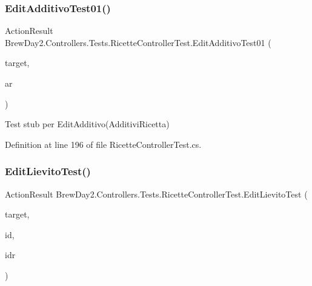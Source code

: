\subsubsection{\texorpdfstring{Edit\+Additivo\+Test01()}{EditAdditivoTest01()}}
{\footnotesize\ttfamily Action\+Result Brew\+Day2.\+Controllers.\+Tests.\+Ricette\+Controller\+Test.\+Edit\+Additivo\+Test01 (\begin{DoxyParamCaption}\item[{\mbox{[}\+Pex\+Assume\+Under\+Test\mbox{]} \mbox{\hyperlink{class_brew_day2_1_1_controllers_1_1_ricette_controller}{Ricette\+Controller}}}]{target,  }\item[{\mbox{\hyperlink{class_brew_day2_1_1_models_1_1_additivi_ricetta}{Additivi\+Ricetta}}}]{ar }\end{DoxyParamCaption})}



Test stub per Edit\+Additivo(\+Additivi\+Ricetta)



Definition at line 196 of file Ricette\+Controller\+Test.\+cs.

\mbox{\label{class_brew_day2_1_1_controllers_1_1_tests_1_1_ricette_controller_test_a60adccf4f96f2727f9b05e25e1237b08}} 
\subsubsection{\texorpdfstring{Edit\+Lievito\+Test()}{EditLievitoTest()}}
{\footnotesize\ttfamily Action\+Result Brew\+Day2.\+Controllers.\+Tests.\+Ricette\+Controller\+Test.\+Edit\+Lievito\+Test (\begin{DoxyParamCaption}\item[{\mbox{[}\+Pex\+Assume\+Under\+Test\mbox{]} \mbox{\hyperlink{class_brew_day2_1_1_controllers_1_1_ricette_controller}{Ricette\+Controller}}}]{target,  }\item[{int}]{id,  }\item[{int}]{idr }\end{DoxyParamCaption})}




